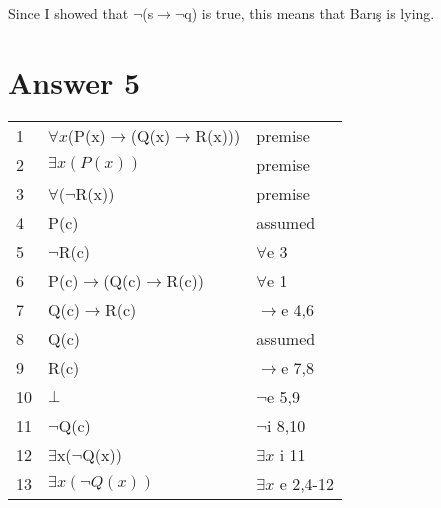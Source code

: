 \documentclass[12pt]{article}
\begin{document}
Since I showed that $\neg$(s$\rightarrow \neg$q) is true, this means that Barış is lying.

\section*{Answer 5}

\begin{table}[H]
	\centering
    
	\begin{tabular}{l l l}
		
1&$\forall x$(P(x)$\rightarrow$(Q(x)$\rightarrow$R(x))) & premise \\
2&$\exists x(P(x))$&premise\\
3&$\forall$($\neg$R(x))&premise\\ \hline
4&P(c)&assumed\\
5&$\neg$R(c)&$\forall$e 3\\
6&P(c)$\rightarrow$(Q(c)$\rightarrow$R(c))&$\forall$e 1\\
7&Q(c)$\rightarrow$R(c)&$\rightarrow$e 4,6\\ \hline \hline
8&Q(c)&assumed\\
9&R(c)&$\rightarrow$e 7,8\\
10&$\bot$&$\neg$e 5,9\\ \hline \hline
11&$\neg$Q(c)&$\neg$i 8,10\\
12&$\exists$x($\neg$Q(x))&$\exists x$ i 11\\ \hline
13&$\exists x(\neg Q(x))$&$\exists x$ e 2,4-12
	
	\end{tabular}
\end{table}
\end{document}
